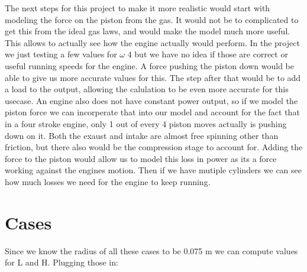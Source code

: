 \documentclass[nofoot,pdf-a,balance,colorlinks,upint,subscriptcorrection,varvw,mathalfa=cal=boondoxo]{asmeconf}
\begin{document}
	The next steps for this project to make it more realistic would start with modeling the force on the piston from the gas. It would not be to complicated to get this from the ideal gas laws, and would make the model much more useful. This allows to actually see how the engine actually would perform. In the project we just testing a few values for $\omega$ 4 but we have no idea if those are correct or useful running speeds for the engine. A force pushing the piston down would be able to give us more accurate values for this. The step after that would be to add a load to the output, allowing the calulation to be even more accurate for this usecase. An engine also does not have constant power output, so if we model the piston force we can incorperate that into our model and account for the fact that in a four stroke engine, only 1 out of every 4 piston moves actually is pushing down on it. Both the exaust and intake are almost free spinning other than friction, but there also would be the compression stage to account for. Adding the force to the piston would allow us to model this loss in power as its a force working against the engines motion. Then if we have mutiple cylinders we can see how much losses we need for the engine to keep running. 


    \appendix
    \section{Cases}\label{appendix:cases}
	  \begin{table}[H]
        \caption[Table]{Cases to consider (Given)}\label{tab:givenCases}
    \end{table}

	Since we know the radius of all these cases to be 0.075 m we can compute values for L and H. Plugging those in:
\begin{table}[H]
        \caption[Table]{Cases to consider (Absolute)}\label{tab:absCases}
    \end{table}
\end{document}
